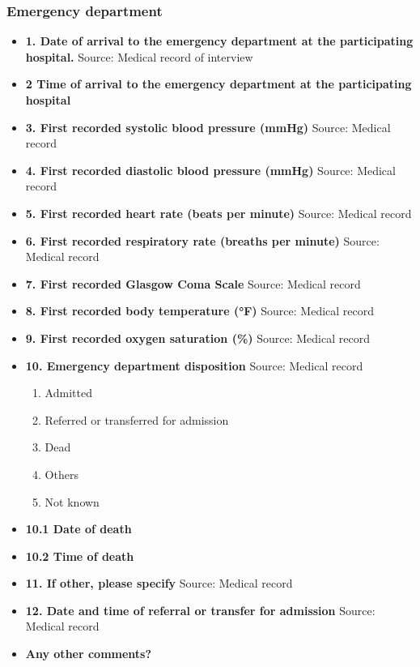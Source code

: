 \documentclass[
]{scrartcl}
\providecommand{\tightlist}{%
  \setlength{\itemsep}{0pt}\setlength{\parskip}{0pt}}\usepackage{longtable,booktabs,array}
\begin{document}
\hypertarget{emergency-department}{%
\subsubsection{Emergency department}\label{emergency-department}}

\begin{itemize}
\item
  \textbf{1. Date of arrival to the emergency department at the
  participating hospital.} Source: Medical record of interview
\item
  \textbf{2 Time of arrival to the emergency department at the
  participating hospital}
\item
  \textbf{3. First recorded systolic blood pressure (mmHg)} Source:
  Medical record
\item
  \textbf{4. First recorded diastolic blood pressure (mmHg)} Source:
  Medical record
\item
  \textbf{5. First recorded heart rate (beats per minute)} Source:
  Medical record
\item
  \textbf{6. First recorded respiratory rate (breaths per minute)}
  Source: Medical record
\item
  \textbf{7. First recorded Glasgow Coma Scale} Source: Medical record
\item
  \textbf{8. First recorded body temperature (°F)} Source: Medical
  record
\item
  \textbf{9. First recorded oxygen saturation (\%)} Source: Medical
  record
\item
  \textbf{10. Emergency department disposition} Source: Medical record

  \begin{enumerate}
  \def\labelenumi{\arabic{enumi}.}
  \tightlist
  \item
    Admitted
  \item
    Referred or transferred for admission
  \item
    Dead
  \item
    Others
  \item
    Not known
  \end{enumerate}
\item
  \textbf{10.1 Date of death}
\item
  \textbf{10.2 Time of death}
\item
  \textbf{11. If other, please specify} Source: Medical record
\item
  \textbf{12. Date and time of referral or transfer for admission}
  Source: Medical record
\item
  \textbf{Any other comments?}
\end{itemize}
\end{document}
